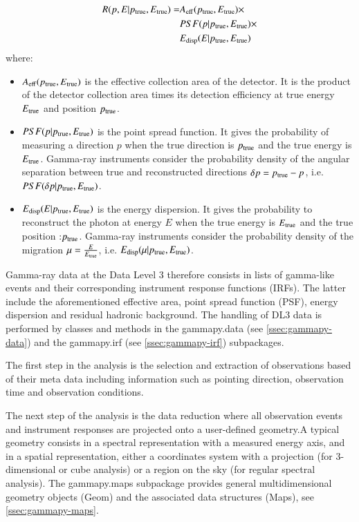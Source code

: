 \begin{align}
   R(p, E|p_{\rm true}, E_{\rm true}) = &A_{\rm eff}(p_{\rm true}, E_{\rm true}) \times\\
    &PSF(p|p_{\rm true}, E_{\rm true}) \times\\
    &E_{\rm disp}(E|p_{\rm true}, E_{\rm true})
\end{align}
where:
\begin{itemize}
\item $A_{\rm eff}(p_{\rm true}, E_{\rm true})$ is the effective collection area of the detector. It is the product
  of the detector collection area times its detection efficiency at true energy $E_{\rm true}$ and position $p_{\rm true}$.
\item $PSF(p|p_{\rm true}, E_{\rm true})$ is the point spread function. It gives the probability of
  measuring a direction $p$ when the true direction is $p_{\rm true}$ and the true energy is $E_{\rm true}$.
  Gamma-ray instruments consider the probability density of the angular separation between true and reconstructed directions
  $\delta p = p_{\rm true} - p$, i.e. $PSF(\delta p|p_{\rm true}, E_{\rm true})$.
\item $E_{\rm disp}(E|p_{\rm true}, E_{\rm true})$ is the energy dispersion. It gives the probability to
  reconstruct the photon at energy $E$ when the true energy is $E_{\rm true}$ and the true position :$p_{\rm true}$.
  Gamma-ray instruments consider the probability density of the migration $\mu=\frac{E}{E_{\rm true}}$,
  i.e. $E_{\rm disp}(\mu|p_{\rm true}, E_{\rm true})$.
\end{itemize}


Gamma-ray data at the Data Level 3 therefore consists in lists of gamma-like events and their
corresponding instrument response functions (IRFs). The latter include the aforementioned
effective area, point spread function (PSF), energy dispersion and residual hadronic background.
The handling of DL3 data is performed by classes and methods
in the gammapy.data  (see \ref{ssec:gammapy-data}) and the gammapy.irf
(see \ref{ssec:gammapy-irf}) subpackages.

The first step in the analysis is the selection and extraction of observations
based of their meta data including information such as pointing direction, observation
time and observation conditions.

The next step of the analysis is the data reduction where all observation events and instrument
responses are projected onto a user-defined geometry.A typical geometry consists in a spectral representation with a measured
energy axis, and in a spatial representation, either a coordinates system  with a projection
(for 3-dimensional or cube analysis) or a region on the sky (for regular spectral analysis).
The gammapy.maps subpackage provides general multidimensional geometry objects
(Geom) and the associated data structures (Maps), see \ref{ssec:gammapy-maps}.

